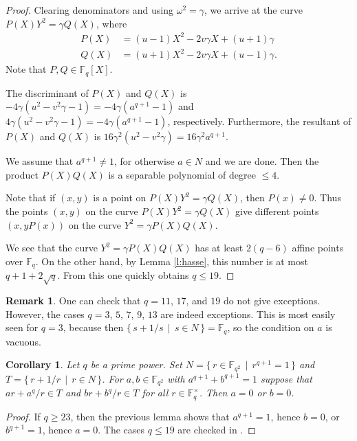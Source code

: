 \documentclass[12pt]{amsart}
\theoremstyle{plain}
\newtheorem{corollary}[theorem]{Corollary}
\theoremstyle{definition}
\newtheorem{remark}[theorem]{Remark}
\numberwithin{equation}{section}
\newcommand*{\defset}[2]{\{\,#1\,\mid\,#2\,\}}
\newcommand{\FF}{\mathbb F}
\newcommand{\Fqs}{\FF_q^\times}
\begin{document}
\begin{proof}
  Clearing denominators and using $\omega^2=\gamma$, we arrive at the
  curve $P(X)Y^2 = \gamma Q(X)$, where
  \begin{align*}
    P(X) &= \left(u - 1\right) X^{2} - 2 v \gamma X + (u+1)\gamma\\
    Q(X) &= \left(u + 1\right) X^{2} - 2 v \gamma X + (u-1)\gamma.
  \end{align*}
  Note that $P, Q\in\FF_q[X]$.

  The discriminant of $P(X)$ and $Q(X)$ is
  $-4\gamma(u^2-v^2\gamma - 1)=-4\gamma(a^{q+1}-1)$ and
  $4\gamma(u^2-v^2\gamma - 1)=-4\gamma(a^{q+1}-1)$,
  respectively. Furthermore, the resultant of $P(X)$ and $Q(X)$ is
  $16\gamma^2(u^2-v^2\gamma)=16\gamma^2a^{q+1}$.

  We assume that $a^{q+1}\ne1$, for otherwise $a\in N$ and we are
  done. Then the product $P(X)Q(X)$ is a separable polynomial of
  degree $\le4$.

  Note that if $(x,y)$ is a point on $P(X)Y^2 = \gamma Q(X)$, then
  $P(x)\ne0$. Thus the points $(x,y)$ on the curve
  $P(X)Y^2 = \gamma Q(X)$ give different points $(x, yP(x))$ on the
  curve $Y^2=\gamma P(X)Q(X)$.

  We see that the curve $Y^2=\gamma P(X)Q(X)$ has at least $2(q-6)$
  affine points over $\FF_q$. On the other hand, by Lemma
  \ref{l:hasse}, this number is at most $q+1+2\sqrt{q}$. From this one
  quickly obtains $q\le19$.
\end{proof}
\begin{remark}
  One can check that $q=11$, $17$, and $19$ do not give exceptions.
  However, the cases $q=3$, $5$, $7$, $9$, $13$ are indeed
  exceptions. This is most easily seen for $q=3$, because then
  $\defset{s+1/s}{s\in N}=\FF_q$, so the condition on $a$ is vacuous.
\end{remark}
\begin{corollary}\label{c:nonsplit}
  Let $q$ be a prime power. Set $N=\defset{r\in\FF_{q^2}}{r^{q+1}=1}$
  and $T=\defset{r+1/r}{r\in N}$. For $a, b\in\FF_{q^2}$ with
  $a^{q+1} + b^{q+1} = 1$ suppose that $ar+a^q/r\in T$ and
  $br+b^q/r\in T$ for all $r\in\Fqs$. Then $a=0$ or $b=0$.
\end{corollary}
\begin{proof}
  If $q\ge23$, then the previous lemma shows that $a^{q+1}=1$, hence
  $b=0$, or $b^{q+1}=1$, hence $a=0$. The cases $q\le19$ are
  checked in \cite{dera_psl2_verify}.
\end{proof}
\end{document}
